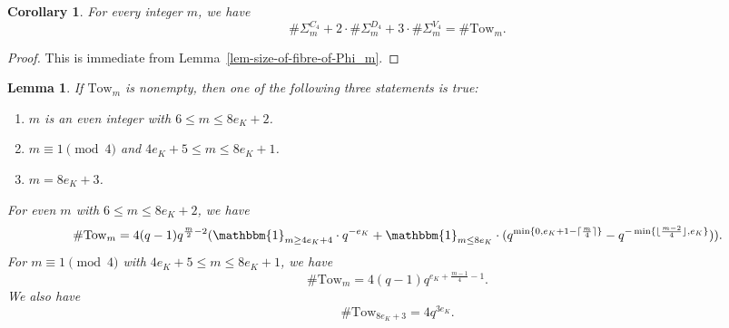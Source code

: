 \documentclass[11pt]{amsart}
\theoremstyle{theorem}
\newtheorem{lemma}[theorem]{Lemma}
\newtheorem{corollary}[theorem]{Corollary}
\theoremstyle{example}
\theoremstyle{definition}
\numberwithin{theorem}{section}
\numberwithin{theorem}{section}
\newcommand{\Tow}{\mathrm{Tow}}
\begin{document}
\begin{corollary}
    \label{cor-Xm-in-terms-of-field-sets}
    For every integer $m$, we have 
    $$
    \# \Sigma_m^{C_4} + 2\cdot \#\Sigma_m^{D_4} + 3\cdot \#\Sigma_m^{V_4} = \# \Tow_m. 
    $$
\end{corollary}
\begin{proof}
    This is immediate from Lemma~\ref{lem-size-of-fibre-of-Phi_m}.
\end{proof}
\begin{lemma}
    \label{lem-size-of-Xm}
    If $\Tow_m$ is nonempty, then one of the following three statements is true: 
    \begin{enumerate}
        \item $m$ is an even integer with $6  \leq m \leq 8e_K + 2$.
        \item $m\equiv 1 \pmod{4}$ and $4e_K + 5 \leq m \leq 8e_K + 1$. 
        \item $m = 8e_K + 3$. 
    \end{enumerate}
    For even $m$ with $6 \leq m \leq 8e_K + 2$, we have 
    $$
    \# \Tow_m = 4(q-1)q^{\frac{m}{2} - 2}(\mathbbm{1}_{m \geq 4e_K + 4}\cdot q^{-e_K} +\mathbbm{1}_{m \leq 8e_K}\cdot ( q^{\min\{0, e_K + 1 - \lceil \frac{m}{4}\rceil\} }- q^{-\min\{\lfloor \frac{m-2}{4}\rfloor, e_K\}})).
    $$
    For $m \equiv 1\pmod{4}$ with $4e_K + 5 \leq m \leq 8e_K + 1$, we have 
    $$
    \# \Tow_m = 4(q-1)q^{e_K + \frac{m-1}{4} - 1}. 
    $$
    We also have 
    $$
    \# \Tow_{8e_K+3} = 4q^{3e_K}. 
    $$
\end{lemma}
\end{document}
